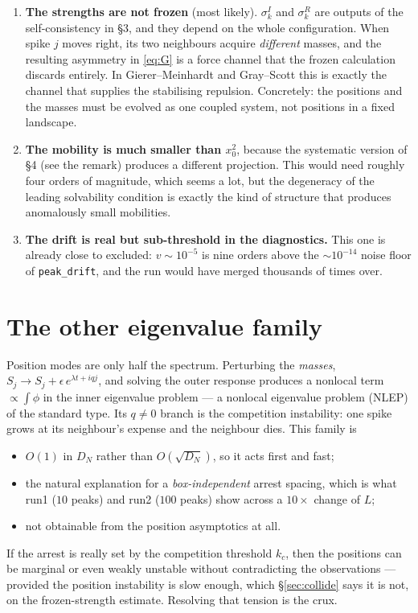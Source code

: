 \documentclass[11pt,a4paper]{article}
\theoremstyle{plain}
\theoremstyle{remark}
\begin{document}
\begin{enumerate}
\item \textbf{The strengths are not frozen} (most likely). $\sigma^I_k$ and
      $\sigma^R_k$ are outputs of the self-consistency in \S3, and they depend on
      the whole configuration. When spike $j$ moves right, its two neighbours
      acquire \emph{different} masses, and the resulting asymmetry in
      \eqref{eq:G} is a force channel that the frozen calculation discards
      entirely. In Gierer--Meinhardt and Gray--Scott this is exactly the channel
      that supplies the stabilising repulsion. Concretely: the positions and the
      masses must be evolved as one coupled system, not positions in a fixed
      landscape.
\item \textbf{The mobility is much smaller than $x_0^2$}, because the systematic
      version of \S4 (see the remark) produces a different projection. This
      would need roughly four orders of magnitude, which seems a lot, but the
      degeneracy of the leading solvability condition is exactly the kind of
      structure that produces anomalously small mobilities.
\item \textbf{The drift is real but sub-threshold in the diagnostics.} This one
      is already close to excluded: $v \sim 10^{-5}$ is nine orders above the
      $\sim 10^{-14}$ noise floor of \texttt{peak\_drift}, and the run would have
      merged thousands of times over.
\end{enumerate}

\section{The other eigenvalue family}

Position modes are only half the spectrum. Perturbing the \emph{masses},
$S_j \to S_j + \epsilon\, e^{\lambda t + i q j}$, and solving the outer response
produces a nonlocal term $\propto \int \phi$ in the inner eigenvalue problem ---
a nonlocal eigenvalue problem (NLEP) of the standard type. Its $q \neq 0$ branch
is the competition instability: one spike grows at its neighbour's expense and
the neighbour dies. This family is
\begin{itemize}
\item $O(1)$ in $D_N$ rather than $O(\sqrt{D_N})$, so it acts first and fast;
\item the natural explanation for a \emph{box-independent} arrest spacing, which
      is what run1 ($10$ peaks) and run2 ($100$ peaks) show across a $10\times$
      change of $L$;
\item not obtainable from the position asymptotics at all.
\end{itemize}
If the arrest is really set by the competition threshold $k_c$, then the
positions can be marginal or even weakly unstable without contradicting the
observations --- provided the position instability is slow enough, which
\S\ref{sec:collide} says it is not, on the frozen-strength estimate. Resolving
that tension is the crux.
\end{document}
